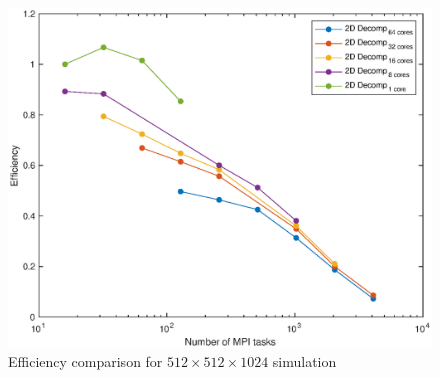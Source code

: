 \begin{figure}
\begin{center}
\includegraphics[scale=0.55]{grafici/5126}
\caption{Efficiency comparison for $512\times 512\times 1024$ simulation}
\label{512:eff}
\end{center}
\end{figure}